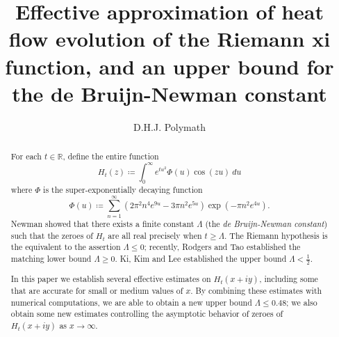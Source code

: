 \documentclass[a4paper,11pt,twoside]{amsart}
\newcommand\R{\mathbb{R}}
\begin{document}
\title[Upper bound for de Bruijn-Newman constant]{Effective approximation of heat flow evolution of the Riemann xi function, and an upper bound for the de Bruijn-Newman constant}

\author{D.H.J. Polymath}
\address{\tt{http://michaelnielsen.org/polymath1/index.php}}


\begin{abstract}
For each $t \in \R$, define the entire function
$$ H_t(z) \coloneqq \int_0^\infty e^{tu^2} \Phi(u) \cos(zu)\ du$$
where $\Phi$ is the super-exponentially decaying function
$$ \Phi(u) \coloneqq \sum_{n=1}^\infty (2\pi^2  n^4 e^{9u} - 3\pi n^2 e^{5u} ) \exp(-\pi n^2 e^{4u} ).$$
Newman showed that there exists a finite constant $\Lambda$ (the \emph{de Bruijn-Newman constant}) such that the zeroes of $H_t$ are all real precisely when $t \geq \Lambda$.  The Riemann hypothesis is the equivalent to the assertion $\Lambda \leq 0$; recently, Rodgers and Tao established the matching lower bound $\Lambda \geq 0$.  Ki, Kim and Lee established the upper bound $\Lambda < \frac{1}{2}$.

In this paper we establish several effective estimates on $H_t(x+iy)$, including some that are accurate for small or medium values of $x$.  By combining these estimates with numerical computations, we are able to obtain a new upper bound $\Lambda \leq 0.48$; we also obtain some new estimates controlling the asymptotic behavior of zeroes of $H_t(x+iy)$ as $x \to \infty$.
\end{abstract}


\maketitle










%
\end{document}
